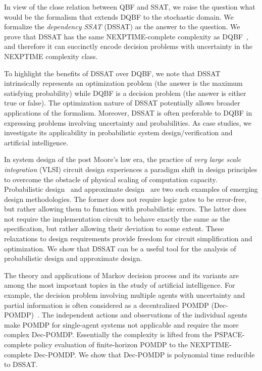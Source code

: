     In view of the close relation between QBF and SSAT, we raise the question what would be the formalism that extends DQBF to the stochastic domain.
    We formalize the \emph{dependency SSAT} (DSSAT) as the answer to the question.
    We prove that DSSAT has the same NEXPTIME-complete complexity as DQBF~\cite{Peterson2001}, and therefore it can succinctly encode decision problems with uncertainty in the NEXPTIME complexity class.

    To highlight the benefits of DSSAT over DQBF, we note that DSSAT intrinsically represents an optimization problem (the answer is the maximum satisfying probability) while DQBF is a decision problem (the answer is either true or false).
    The optimization nature of DSSAT potentially allows broader applications of the formalism.
    Moreover, DSSAT is often preferable to DQBF in expressing problems involving uncertainty and probabilities.
    As case studies, we investigate its applicability in probabilistic system design/verification and artificial intelligence.

    In system design of the post Moore's law era, the practice of \textit{very large scale integration} (VLSI) circuit design experiences a paradigm shift in design principles to overcome the obstacle of physical scaling of computation capacity.
    Probabilistic design~\cite{Chakrapani2006ProbDesign} and approximate design~\cite{Venkatesan2011ApproxDesign} are two such examples of emerging design methodologies.
    The former does not require logic gates to be error-free, but rather allowing them to function with probabilistic errors.
    The latter does not require the implementation circuit to behave exactly the same as the specification, but rather allowing their deviation to some extent.
    These relaxations to design requirements provide freedom for circuit simplification and optimization.
    We show that DSSAT can be a useful tool for the analysis of probabilistic design and approximate design.

    The theory and applications of Markov decision process and its variants are among the most important topics in the study of artificial intelligence.
    For example, the decision problem involving multiple agents with uncertainty and partial information is often considered as a decentralized POMDP (Dec-POMDP)~\cite{Oliehoek2016}.
    The independent actions and observations of the individual agents make POMDP for single-agent systems not applicable and require the more complex Dec-POMDP.
    Essentially the complexity is lifted from the PSPACE-complete policy evaluation of finite-horizon POMDP to the NEXPTIME-complete Dec-POMDP.
    We show that Dec-POMDP is polynomial time reducible to DSSAT.

